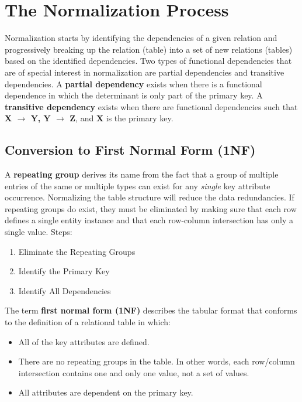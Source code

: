 \documentclass[a4paper, 12pt, titlepage]{report}
\begin{document}
{\section{The Normalization Process}
Normalization starts by identifying the dependencies of a given relation and progressively breaking up the relation (table) into a set of new relations (tables) based on the identified dependencies. Two types of functional dependencies that are of special interest in normalization are partial dependencies and transitive dependencies. A \textbf{partial dependency} exists when there is a functional dependence in which the determinant is only part of the primary key. A \textbf{transitive dependency} exists when there are functional dependencies such that \textbf{X $\longrightarrow$ Y, Y $\longrightarrow$ Z}, and \textbf{X} is the primary key.
\subsection{Conversion to First Normal Form (1NF)}
A \textbf{repeating group} derives its name from the fact that a group of multiple entries of the same or multiple types can exist for any \emph{single} key attribute occurrence. Normalizing the table structure will reduce the data redundancies. If repeating groups do exist, they must be eliminated by making sure that each row defines a single entity instance and that each row-column intersection has only a single value.
Steps:
\begin{enumerate}
\item  Eliminate the Repeating Groups
\item Identify the Primary Key
\item Identify All Dependencies
\end{enumerate}
The term \textbf{first normal form (1NF)} describes the tabular format that conforms to the definition of a relational table in which:
\begin{itemize}
\item All of the key attributes are defined.
\item There are no repeating groups in the table. In other words, each row/column intersection contains one and only one value, not a set of values.
\item All attributes are dependent on the primary key.
\end{itemize}
}
\end{document}
